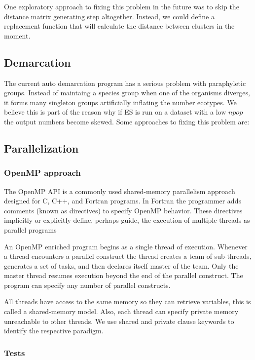 One exploratory approach to fixing this problem in the future was to skip the distance matrix generating step altogether.
Instead, we could define a replacement function that will calculate the distance between clusters in the moment.


\subsection*{Demarcation}
The current auto demarcation program has a serious problem with paraphyletic groups.
Instead of maintaing a species group when one of the organisms diverges, it forms many singleton groups artificially inflating the number ecotypes.
We believe this is part of the reason why if ES is run on a dataset with a low $npop$ the output numbers become skewed.
Some approaches to fixing this problem are:

\noindent{}

\subsection*{Parallelization}
\subsubsection*{OpenMP approach} %
The OpenMP API is a commonly used shared-memory parallelism approach designed for C, C++, and Fortran programs.
In Fortran the programmer adds comments (known as directives) to specify OpenMP behavior.
These directives implicitly or explicitly define, perhaps guide, the execution of multiple threads as parallel programs

An OpenMP enriched program begins as a single thread of execution.
Whenever a thread encounters a parallel construct the thread creates a team of sub-threads, generates a set of tasks, and then declares itself master of the team.
Only the master thread resumes execution beyond the end of the parallel construct.
The program can specify any number of parallel constructs.

All threads have access to the same memory so they can retrieve variables, this is called a shared-memory model.
Also, each thread can specify private memory unreachable to other threads.
We use shared and private clause keywords to identify the respective paradigm.

\subsubsection*{Tests}
